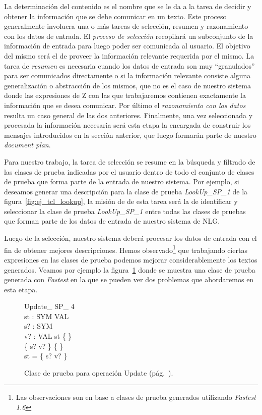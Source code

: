 La determinación del contenido es el nombre que se le da a la tarea de decidir y obtener la información que se debe comunicar en un texto. Este proceso generalmente involucra una o más tareas de selección, resumen y razonamiento con los datos de entrada.
El \emph{proceso de selección} recopilará un subconjunto de la información de entrada para luego poder ser comunicada al usuario. El objetivo del mismo será el de proveer la información relevante requerida por el mismo.
La tarea de \emph{resumen} es necesaria cuando los datos de entrada son muy ``granulados'' para ser comunicados directamente o si la información relevante consiste alguna generalización o abstracción de los mismos, que no es el caso de nuestro sistema donde las expresiones de Z con las que trabajaremos contienen exactamente la información que se desea comunicar.
Por último el \emph{razonamiento con los datos} resulta un caso general de las dos anteriores. Finalmente, una vez seleccionada y procesada la información necesaria será esta etapa la encargada de construir los mensajes introducidos en la sección anterior, que luego formarán parte de nuestro \emph{document plan}.

Para nuestro trabajo, la tarea de selección se resume en la búsqueda y filtrado de las clases de prueba indicadas por el usuario dentro de todo el conjunto de clases de prueba que forma parte de la entrada de nuestro sistema. Por ejemplo, si deseamos generar una descripción para la clase de prueba \emph{LookUp\_SP\_1} de la figura~\ref{fig:ej_tcl_lookup}, la misión de de esta tarea será la de identificar y seleccionar la clase de prueba \emph{LookUp\_SP\_1} entre todas las clases de pruebas que forman parte de los datos de entrada de nuestro sistema de NLG.

Luego de la selección, nuestro sistema deberá procesar los datos de entrada con el fin de obtener mejores descripciones. Hemos observado\footnote{Las observaciones son en base a clases de prueba generados utilizando \emph{Fastest 1.6}} que trabajando ciertas expresiones en las clases de prueba podemos mejorar considerablemente los textos generados. Veamos por ejemplo la figura~\ref{fig:ej_update_sp_4} donde se muestra una clase de prueba generada con \emph{Fastest} en la que se pueden ver dos problemas que abordaremos en esta etapa.

\begin{figure}[H]
  \centering
  \begin{schema}{Update\_ SP\_ 4}\\
   st : SYM \pfun VAL \\
   s? : SYM \\
   v? : VAL 
  \where
   st \neq \{ \} \\
   \{ s? \mapsto v? \} \neq \{ \} \\
   \dom st = \dom \{ s? \mapsto v? \}
  \end{schema}
  \caption{Clase de prueba para operación Update (pág.~\pageref{fig:spec_symbol_table}).}
  \label{fig:ej_update_sp_4}
\end{figure}

